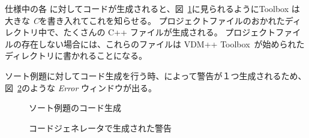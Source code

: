 \documentclass[\pformat,12pt]{jarticle}
\newcommand{\ToolboxName}{VDM++ Toolbox}
\begin{document}
仕様中の各  に対してコードが生成されると、図~\ref{fig:cg2}に見られるようにToolbox は大きな {\em \large{C}}を書き入れてこれを知らせる。
プロジェクトファイルのおかれたディレクトリ中で、たくさんの C++ ファイルが生成される。
プロジェクトファイルの存在しない場合には、これらのファイルは \ToolboxName\ が始められたディレクトリに書かれることになる。

ソート例題に対してコード生成を行う時、\tcg{}によって警告が１つ生成されるため、図~\ref{fig:cg_error}のような {\em Error} ウィンドウが出る。

\begin{figure}[tbh]
\begin{center}
\mbox{}
\caption{ソート例題のコード生成}\label{fig:cg2}
\end{center}
\end{figure}


\begin{figure}[tbh]
\begin{center}
\mbox{}
\caption{コードジェネレータで生成された警告}\label{fig:cg_error}
\end{center}
\end{figure}
\end{document}
